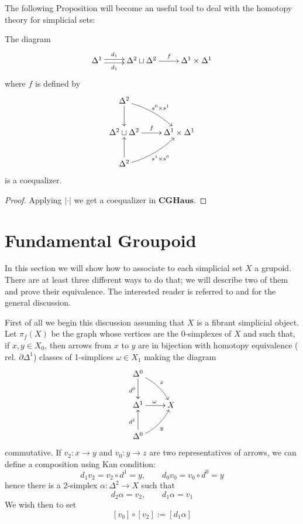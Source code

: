 The following Proposition will become an useful tool to deal with the homotopy theory for simplicial sets:

\begin{prop} \label{prop homotopy theory for sset coequalizer}
The diagram
\[
\xymatrix{
\Delta^1 \ar@<.5ex>[r]^-{d_1} \ar@<-.5ex>[r]_-{d_1} & \Delta^2 \sqcup \Delta^2 \ar[r]^f & \Delta^1 \times \Delta^1
}
\]
where $f$ is defined by
\[
\xymatrix{
\Delta^2 \ar[d] \ar@/^.5pc/[dr]^{s^0 \times s^1} \\ \Delta^2 \sqcup \Delta^2 \ar[r]^f & \Delta^1 \times \Delta^1 \\ \Delta^2 \ar[u] \ar@/_.5pc/[ur]_{s^1 \times s^0}
}
\]
is a coequalizer.
\end{prop}

\begin{proof}
Applying $| \cdot |$ we get a coequalizer in $\mathbf{CGHaus}$.
\end{proof}

\section{Fundamental Groupoid}

In this section we will show how to associate to each simplicial set $X$ a grupoid. There are at least three different ways to do that; we will describe two of them and prove their equivalence. The interested reader is referred to \cite[Ch. I.8]{gj} and \cite[Ch. III.1]{gj} for the general discussion.

First of all we begin this discussion assuming that $X$ is a fibrant simplicial object. Let $\pi_f(X)$ be the graph whose vertices are the $0$-simplexes of $X$ and such that, if $x, y \in X_0$, then arrows from $x$ to $y$ are in bijection with homotopy equivalence ($\text{rel. } \partial \Delta^1$) classes of 1-simplices $\omega \in X_1$ making the diagram
\[
\xymatrix{
\Delta^0 \ar[d]_{d^0} \ar@/^.5pc/[dr]^x \\ \Delta^1 \ar[r]^\omega & X \\ \Delta^0 \ar[u]^{d^1} \ar@/_.5pc/[ur]_y
}
\]
commutative. If $v_2 \colon x \to y$ and $v_0 \colon y \to z$ are two representatives of arrows, we can define a composition using Kan condition:
\[
d_1 v_2 = v_2 \circ d^1 = y, \qquad d_0 v_0 = v_0 \circ d^0 = y
\]
hence there is a 2-simplex $\alpha \colon \Delta^2 \to X$ such that
\[
d_2 \alpha = v_2, \qquad d_1 \alpha = v_1
\]
We wish then to set
\begin{equation} \label{eq composition fundamental grupoid}
[v_0] \circ [v_2] := [d_1 \alpha]
\end{equation}

